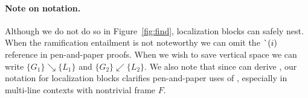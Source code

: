 \paragraph{Note on notation.} Although we do not do so in Figure~\ref{fig:find}, localization blocks can safely nest.  When the ramification entailment is not noteworthy we can omit the $\lightning(i)$ reference in pen-and-paper proofs.  When we wish to save vertical space we can write $\{ G_1 \} \searrow \{ L_1 \}$ and $\{ G_2 \} \swarrow \{ L_2 \}$.
We also note that since  can derive , our notation for localization blocks clarifies pen-and-paper uses of , especially in multi-line contexts with nontrivial frame $F$.

